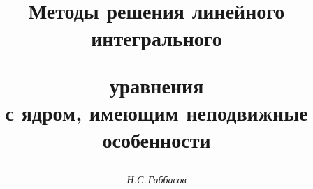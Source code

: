 

 




\newcommand{\Span}{\operatorname{span}} 


\newcommand{\const}{\operatorname{const}} 


\newcommand{\tts}[1]{} 


\renewcommand{\baselinestretch}{0.95}


 




\setcounter{page}{12} 












 


\author{\it Н.С.\,Габбасов} 




\title{Методы решения линейного интегрального  


уравнения\\ с ядром, имеющим неподвижные особенности} 


 


\date{} 




\pagestyle{plain} %


 




\maketitle 


